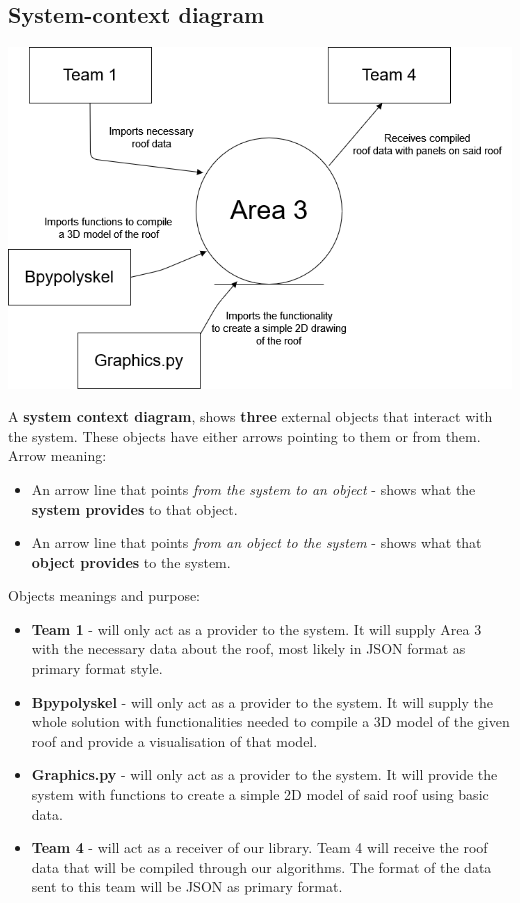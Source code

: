 \documentclass[a4paper,12pt,fleqn]{article}
\begin{document}
\subsection{System-context diagram}
\begin{center}
    \includegraphics[scale=0.4]{main/images/system-context-diagram.png}
\end{center}
A \textbf{system context diagram}, shows \textbf{three} external objects that interact
with the system. These objects have either arrows pointing to them or from them.\\ Arrow meaning:
\begin{itemize}
    \item An arrow line that points \textit{from the system to an object} - shows
what the \textbf{system provides} to that object.
    \item An arrow line that points \textit{from an object to the
system} - shows what that \textbf{object provides} to the system.
\end{itemize}
Objects meanings and purpose:
\begin{itemize}
    \item \textbf{Team 1} - will only act as a provider to the system. It will supply Area 3 with the necessary data about the roof, most likely in JSON format as primary format style.
    \item \textbf{Bpypolyskel} - will only act as a provider to the system. It will supply the whole solution with functionalities needed to compile a 3D model of the given roof and provide a visualisation of that model.
    \item \textbf{Graphics.py} - will only act as a provider to the system. It will provide the system with functions to create a simple 2D model of said roof using basic data.
    \item \textbf{Team 4} - will act as a receiver of our library. Team 4 will receive the roof data that will be compiled through our algorithms. The format of the data sent to this team will be JSON as primary format.
\end{itemize}
\end{document}
